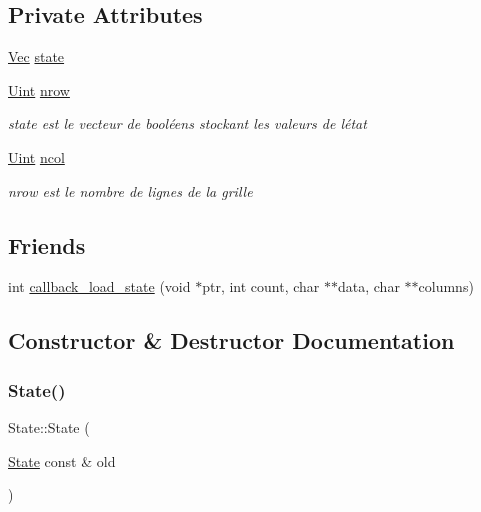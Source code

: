 \subsection*{Private Attributes}
\begin{DoxyCompactItemize}
\item 
\mbox{\hyperlink{state_8h_aa074fbe250e9d18fbe221bb7473158ad}{Vec}} \mbox{\hyperlink{class_state_a7b36c08c9e5e334a2bbd6c4f38f75d21}{state}}
\item 
\mbox{\hyperlink{state_8h_a4840c4503b7d10cea5e08416eb3716f1}{Uint}} \mbox{\hyperlink{class_state_ae3394f187fa7e76395a620c96f03d1a2}{nrow}}
\begin{DoxyCompactList}\small\item\em state est le vecteur de booléens stockant les valeurs de l\textquotesingle{}état \end{DoxyCompactList}\item 
\mbox{\hyperlink{state_8h_a4840c4503b7d10cea5e08416eb3716f1}{Uint}} \mbox{\hyperlink{class_state_a94feee6145041e8521a7c94f3e416887}{ncol}}
\begin{DoxyCompactList}\small\item\em nrow est le nombre de lignes de la grille \end{DoxyCompactList}\end{DoxyCompactItemize}
\subsection*{Friends}
\begin{DoxyCompactItemize}
\item 
int \mbox{\hyperlink{class_state_a62de6fe2f55d6e7c3af99e11f5bf3cad}{callback\+\_\+load\+\_\+state}} (void $\ast$ptr, int count, char $\ast$$\ast$data, char $\ast$$\ast$columns)
\end{DoxyCompactItemize}


\subsection{Constructor \& Destructor Documentation}
\mbox{\label{class_state_a66c925e564c8e29814ec8519e90fdf90}} 
\subsubsection{\texorpdfstring{State()}{State()}\hspace{0.1cm}{\footnotesize\ttfamily [1/7]}}
{\footnotesize\ttfamily State\+::\+State (\begin{DoxyParamCaption}\item[{\mbox{\hyperlink{class_state}{State}} const \&}]{old }\end{DoxyParamCaption})}



